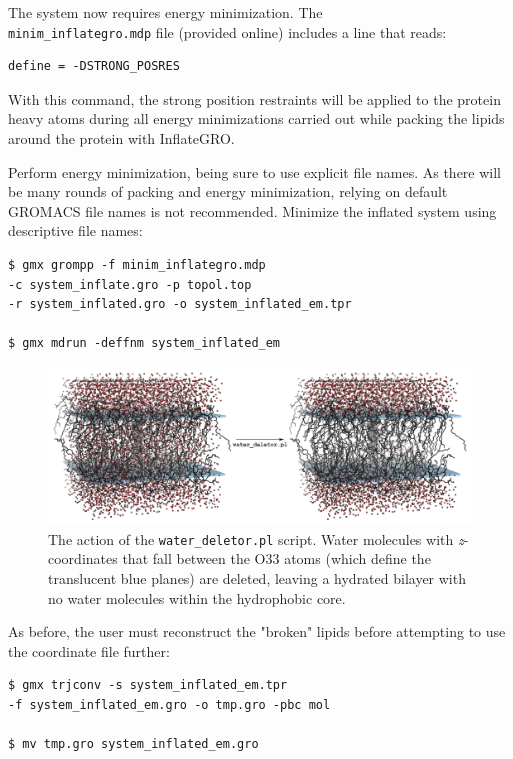 \documentclass[9pt,tutorial]{livecoms}
\begin{document}
The system now requires energy minimization. The\\ \texttt{minim\_inflategro.mdp} file (provided online) includes a line that reads:

\begin{verbatim}
define = -DSTRONG_POSRES
\end{verbatim}

With this command, the strong position restraints will be applied to the protein heavy atoms during all energy minimizations carried out while packing the lipids around the protein with InflateGRO.

Perform energy minimization, being sure to use explicit file names. As there will be many rounds of packing and energy minimization, relying on default GROMACS file names is not recommended. Minimize the inflated system using descriptive file names:

\begin{verbatim}
$ gmx grompp -f minim_inflategro.mdp 
-c system_inflate.gro -p topol.top 
-r system_inflated.gro -o system_inflated_em.tpr

$ gmx mdrun -deffnm system_inflated_em
\end{verbatim}

\begin{figure}[h!]
\centering
\includegraphics{kalp_dppc_water_deletor}
\caption{The action of the \texttt{water\_deletor.pl} script. Water molecules with {\em z}-coordinates that fall between the O33 atoms (which define the translucent blue planes) are deleted, leaving a hydrated bilayer with no water molecules within the hydrophobic core.}
\label{kalp_lipid_water_delete}
\end{figure}

As before, the user must reconstruct the "broken" lipids before attempting to use the coordinate file further:

\begin{verbatim}
$ gmx trjconv -s system_inflated_em.tpr 
-f system_inflated_em.gro -o tmp.gro -pbc mol

$ mv tmp.gro system_inflated_em.gro
\end{verbatim}
\end{document}
